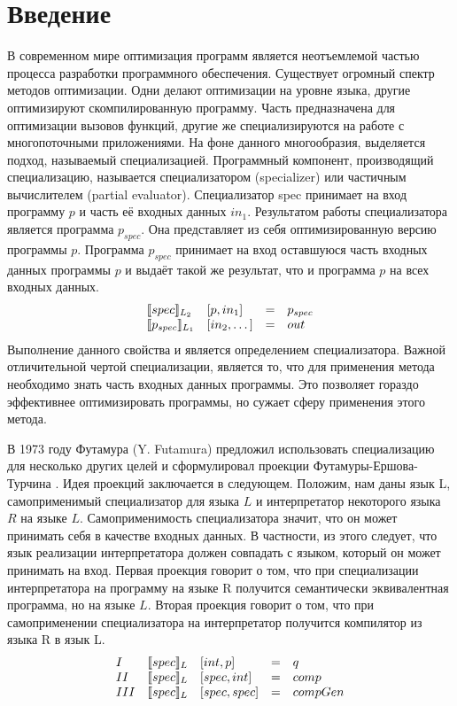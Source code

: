 \section*{Введение}
В современном мире оптимизация программ является неотъемлемой частью процесса разработки программного обеспечения. Существует огромный спектр методов оптимизации. Одни делают оптимизации на уровне языка, другие оптимизируют скомпилированную программу. Часть предназначена для оптимизации вызовов функций, другие же специализируются на работе с многопоточными приложениями. На фоне данного многообразия, выделяется подход, называемый специализацией. Программный компонент, производящий специализацию, называется специализатором (specializer) или частичным вычислителем (partial evaluator). Специализатор spec принимает на вход программу $p$ и часть её входных данных $in_1$. Результатом работы специализатора является программа $p_{spec}$. Она представляет из себя оптимизированную версию программы $p$. Программа $p_{spec}$ принимает на вход оставшуюся часть входных данных программы $p$ и выдаёт такой же результат, что и программа $p$ на всех входных данных. 
$$\begin{array}{l l c l}
        \llbracket spec \rrbracket_{L_2} & [p, in_1] &= &p_{spec}\\
        \llbracket p_{spec} \rrbracket_{L_1} & [in_2 ,\dots] &= &out
      \end{array}$$
Выполнение данного свойства и является определением специализатора. Важной отличительной чертой специализации, является то, что для применения метода необходимо знать часть входных данных программы. Это позволяет гораздо эффективнее оптимизировать программы, но сужает сферу применения этого метода.


В 1973 году Футамура (Y. Futamura) предложил использовать специализацию для несколько других целей и сформулировал проекции Футамуры-Ершова-Турчина \cite{Futa}. Идея проекций заключается в следующем. Положим, нам даны язык L, самоприменимый специализатор для языка $L$ и интерпретатор некоторого языка $R$ на языке $L$. Самоприменимость специализатора значит, что он может принимать себя в качестве входных данных. В частности, из этого следует, что язык реализации интерпретатора должен совпадать с языком, который он может принимать на вход. Первая проекция говорит о том, что при специализации интерпретатора на программу на языке R получится семантически эквивалентная программа, но на языке $L$. Вторая проекция говорит о том, что при самоприменении специализатора на интерпретатор получится компилятор из языка R в язык L.
    $$
    \begin{array}{l l l c l}
      I & \llbracket spec \rrbracket_L &[int, p] &= &q\\
      II & \llbracket spec \rrbracket_L &[spec, int] &= &comp\\
      III & \llbracket spec \rrbracket_L &[spec, spec] &= &compGen
    \end{array}$$  

